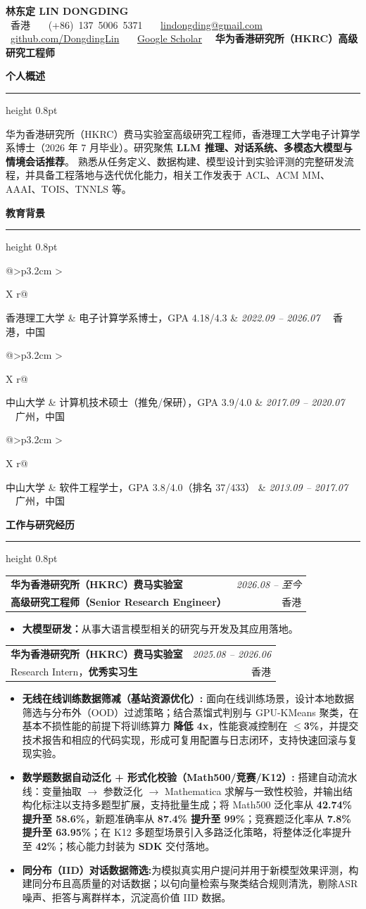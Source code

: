 \documentclass[11pt,a4paper,fontset=fandol]{ctexart}
\makeatletter
\newcommand{\Section}[1]{%
    \vspace{0.50em}
    {\color{Accent}\bfseries\large #1}\par
    \vspace{0.26em}
    {\color{RuleGray}\hrule height 0.8pt}
    \vspace{0.42em}
}
\newcommand{\Entry}[4]{%
\begin{tabularx}{\linewidth}{@{}Xr@{}}
\textbf{#1} & \textit{#2}\\
{\small #3} & {\small #4}
\end{tabularx}\vspace{0.16em}
}
\newcommand{\EduOneLine}[5][0.18em]{%
\begin{tabularx}{\linewidth}{@{}>{\bfseries}p{3.2cm} >{\raggedright\arraybackslash}X r@{}}
#2 & {\small #4} & {\small \textit{#3} \ \textbullet\ #5}
\end{tabularx}\vspace{#1}
}
\makeatother
\begin{document}
\color{BodyText}

\begin{center}
{\fontsize{23}{23}\selectfont\bfseries\color{Accent} 林东定 \quad LIN DONGDING}\\[3pt]
{\small
\faMapMarker*\ 香港 \ \textbullet\ 
\faPhone\ (+86)~137~5006~5371 \ \textbullet\ 
\faEnvelope\ \href{mailto:lindongding@gmail.com}{lindongding@gmail.com}\\[2pt]
\faGithub\ \href{https://github.com/DongdingLin}{github.com/DongdingLin}
\ \textbullet\
\faGraduationCap\ \href{https://scholar.google.com/citations?user=JM4i0R8AAAAJ}{Google Scholar}
\ \textbullet\
\textbf{华为香港研究所（HKRC）高级研究工程师}
}
\end{center}

\Section{个人概述}
华为香港研究所（HKRC）费马实验室高级研究工程师，香港理工大学电子计算学系博士（2026 年 7 月毕业）。研究聚焦 \textbf{LLM 推理、对话系统、多模态大模型与情境会话推荐}。
熟悉从任务定义、数据构建、模型设计到实验评测的完整研发流程，并具备工程落地与迭代优化能力，相关工作发表于 ACL、ACM MM、AAAI、TOIS、TNNLS 等。

\Section{教育背景}
\EduOneLine{香港理工大学}{2022.09 -- 2026.07}{电子计算学系博士，GPA 4.18/4.3}{香港，中国}
\EduOneLine{中山大学}{2017.09 -- 2020.07}{计算机技术硕士（推免/保研），GPA 3.9/4.0}{广州，中国}
\EduOneLine[-1.4em]{中山大学}{2013.09 -- 2017.07}{软件工程学士，GPA 3.8/4.0（排名 37/433）}{广州，中国}

\Section{工作与研究经历}
\Entry{华为香港研究所（HKRC）费马实验室}{2026.08 -- 至今}{\textbf{高级研究工程师（Senior Research Engineer）}}{香港}
\begin{itemize}
    \item \textbf{大模型研发：}从事大语言模型相关的研究与开发及其应用落地。
\end{itemize}

\Entry{华为香港研究所（HKRC）费马实验室}{2025.08 -- 2026.06}{Research Intern，\textbf{优秀实习生}}{香港}
\begin{itemize}
    \item \textbf{无线在线训练数据筛减（基站资源优化）:}
    面向在线训练场景，设计本地数据筛选与分布外（OOD）过滤策略；结合蒸馏式判别与 GPU-KMeans 聚类，在基本不损性能的前提下将训练算力 \textbf{降低 4x}，性能衰减控制在 \textbf{$\le$3\%}，并提交技术报告和相应的代码实现，形成可复用配置与日志闭环，支持快速回滚与复现实验。
    \item \textbf{数学题数据自动泛化 + 形式化校验（Math500/竞赛/K12）:} 搭建自动流水线：变量抽取 $\rightarrow$ 参数泛化 $\rightarrow$ Mathematica 求解与一致性校验，并输出结构化标注以支持多题型扩展，支持批量生成；将 Math500 泛化率从 \textbf{42.74\% 提升至 58.6\%}，新题准确率从 \textbf{87.4\% 提升至 99\%}；竞赛题泛化率从 \textbf{7.8\% 提升至 63.95\%}；在 K12 多题型场景引入多路泛化策略，将整体泛化率提升至 \textbf{42\%}；核心能力封装为 \textbf{SDK} 交付落地。
    \item \textbf{同分布（IID）对话数据筛选:}为模拟真实用户提问并用于新模型效果评测，构建同分布且高质量的对话数据；以句向量检索与聚类结合规则清洗，剔除ASR噪声、拒答与离群样本，沉淀高价值 IID 数据。

\end{itemize}
\end{document}
